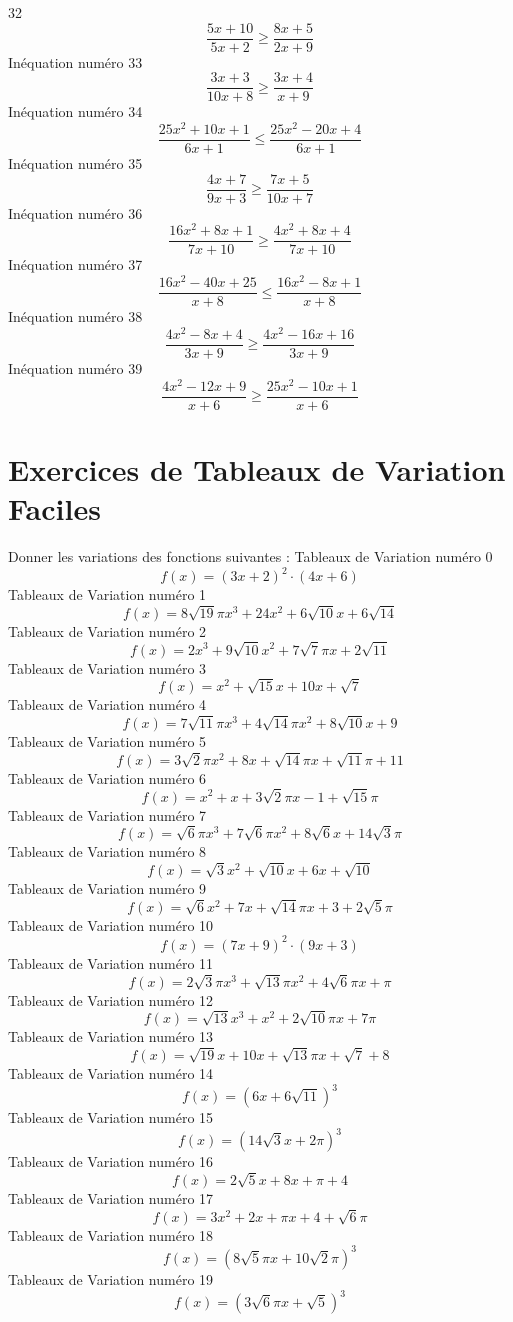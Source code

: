 \documentclass{article}
\begin{document}
32 \[\frac{5 x + 10}{5 x + 2} \geq \frac{8 x + 5}{2 x + 9}\]In\'equation num\'ero 33 \[\frac{3 x + 3}{10 x + 8} \geq \frac{3 x + 4}{x + 9}\]In\'equation num\'ero 34 \[\frac{25 x^{2} + 10 x + 1}{6 x + 1} \leq \frac{25 x^{2} - 20 x + 4}{6 x + 1}\]In\'equation num\'ero 35 \[\frac{4 x + 7}{9 x + 3} \geq \frac{7 x + 5}{10 x + 7}\]In\'equation num\'ero 36 \[\frac{16 x^{2} + 8 x + 1}{7 x + 10} \geq \frac{4 x^{2} + 8 x + 4}{7 x + 10}\]In\'equation num\'ero 37 \[\frac{16 x^{2} - 40 x + 25}{x + 8} \leq \frac{16 x^{2} - 8 x + 1}{x + 8}\]In\'equation num\'ero 38 \[\frac{4 x^{2} - 8 x + 4}{3 x + 9} \geq \frac{4 x^{2} - 16 x + 16}{3 x + 9}\]In\'equation num\'ero 39 \[\frac{4 x^{2} - 12 x + 9}{x + 6} \geq \frac{25 x^{2} - 10 x + 1}{x + 6}\]
 \section{Exercices de Tableaux de Variation Faciles}

 Donner les variations des fonctions suivantes : 
Tableaux de Variation num\'ero 0 \[f(x) = \left(3 x + 2\right)^{2} \cdot \left(4 x + 6\right)\]Tableaux de Variation num\'ero 1 \[f(x) = 8 \sqrt{19} \pi x^{3} + 24 x^{2} + 6 \sqrt{10} x + 6 \sqrt{14}\]Tableaux de Variation num\'ero 2 \[f(x) = 2 x^{3} + 9 \sqrt{10} x^{2} + 7 \sqrt{7} \pi x + 2 \sqrt{11}\]Tableaux de Variation num\'ero 3 \[f(x) = x^{2} + \sqrt{15} x + 10 x + \sqrt{7}\]Tableaux de Variation num\'ero 4 \[f(x) = 7 \sqrt{11} \pi x^{3} + 4 \sqrt{14} \pi x^{2} + 8 \sqrt{10} x + 9\]Tableaux de Variation num\'ero 5 \[f(x) = 3 \sqrt{2} \pi x^{2} + 8 x + \sqrt{14} \pi x + \sqrt{11} \pi + 11\]Tableaux de Variation num\'ero 6 \[f(x) = x^{2} + x + 3 \sqrt{2} \pi x - 1 + \sqrt{15} \pi\]Tableaux de Variation num\'ero 7 \[f(x) = \sqrt{6} \pi x^{3} + 7 \sqrt{6} \pi x^{2} + 8 \sqrt{6} x + 14 \sqrt{3} \pi\]Tableaux de Variation num\'ero 8 \[f(x) = \sqrt{3} x^{2} + \sqrt{10} x + 6 x + \sqrt{10}\]Tableaux de Variation num\'ero 9 \[f(x) = \sqrt{6} x^{2} + 7 x + \sqrt{14} \pi x + 3 + 2 \sqrt{5} \pi\]Tableaux de Variation num\'ero 10 \[f(x) = \left(7 x + 9\right)^{2} \cdot \left(9 x + 3\right)\]Tableaux de Variation num\'ero 11 \[f(x) = 2 \sqrt{3} \pi x^{3} + \sqrt{13} \pi x^{2} + 4 \sqrt{6} \pi x + \pi\]Tableaux de Variation num\'ero 12 \[f(x) = \sqrt{13} x^{3} + x^{2} + 2 \sqrt{10} \pi x + 7 \pi\]Tableaux de Variation num\'ero 13 \[f(x) = \sqrt{19} x + 10 x + \sqrt{13} \pi x + \sqrt{7} + 8\]Tableaux de Variation num\'ero 14 \[f(x) = \left(6 x + 6 \sqrt{11}\right)^{3}\]Tableaux de Variation num\'ero 15 \[f(x) = \left(14 \sqrt{3} x + 2 \pi\right)^{3}\]Tableaux de Variation num\'ero 16 \[f(x) = 2 \sqrt{5} x + 8 x + \pi + 4\]Tableaux de Variation num\'ero 17 \[f(x) = 3 x^{2} + 2 x + \pi x + 4 + \sqrt{6} \pi\]Tableaux de Variation num\'ero 18 \[f(x) = \left(8 \sqrt{5} \pi x + 10 \sqrt{2} \pi\right)^{3}\]Tableaux de Variation num\'ero 19 \[f(x) = \left(3 \sqrt{6} \pi x + \sqrt{5}\right)^{3}\]
\end{document}

